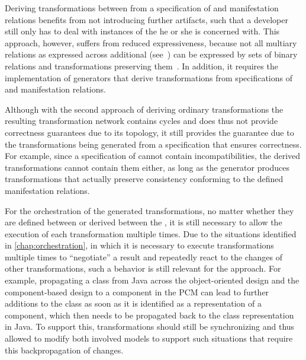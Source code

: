 Deriving transformations between \concretemetamodels from a specification of \conceptmetamodels and manifestation relations benefits from not introducing further artifacts, such that a developer still only has to deal with instances of the \concretemetamodels he or she is concerned with.
This approach, however, suffers from reduced expressiveness, because not all multiary relations as expressed across additional \conceptmetamodels (see~\cite{diskin2018MultiModelSynchronization-FASE}) can be expressed by sets of binary relations and transformations preserving them~\cite{stevens2020BidirectionalTransformationLarge-SoSym}.
In addition, it requires the implementation of generators that derive transformations from specifications of \conceptmetamodels and manifestation relations.

Although with the second approach of deriving ordinary transformations the resulting transformation network contains cycles and does thus not provide correctness guarantees due to its topology, it still provides the guarantee due to the transformations being generated from a specification that ensures correctness.
For example, since a specification of \commonalities cannot contain incompatibilities, the derived transformations cannot contain them either, as long as the generator produces transformations that actually preserve consistency conforming to the defined manifestation relations.

For the orchestration of the generated transformations, no matter whether they are defined between \conceptmetamodels or derived between the \concretemetamodels, it is still necessary to allow the execution of each transformation multiple times.
Due to the situations identified in \autoref{chap:orchestration}, in which it is necessary to execute transformations multiple times to \enquote{negotiate} a result and repeatedly react to the changes of other transformations, such a behavior is still relevant for the \commonalities approach.
For example, propagating a class from Java across the object-oriented design \conceptmetamodel and the component-based design \conceptmetamodel to a component in the \gls{PCM} can lead to further additions to the class as soon as it is identified as a representation of a component, which then needs to be propagated back to the class representation in Java.
To support this, transformations should still be synchronizing and thus allowed to modify both involved models to support such situations that require this backpropagation of changes.

